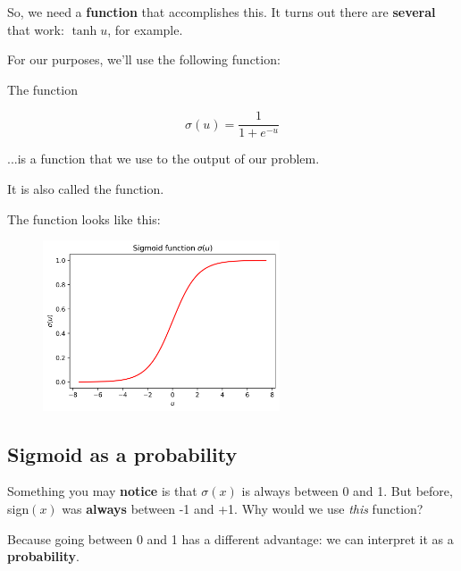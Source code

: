         So, we need a \textbf{function} that accomplishes this. It turns out there are \textbf{several} that work: $\tanh{u}$, for example.
        
        For our purposes, we'll use the following function:\\
        
        \begin{definition}
            The  function
            
            \begin{equation}
                \sigma(u) = \frac{1}{1+e^{-u}}
            \end{equation}
            
            ...is a  function that we use to  the output of our  problem.
            
            It is also called the  function.
        \end{definition}
        
        The function looks like this:
        
        \begin{figure}[H]
            \centering
            
            \includegraphics[width=70mm,scale=0.5]{images/classification_images/sigmoid_u.png}
        \end{figure}
        
    \subsection*{Sigmoid as a probability}
        
        Something you may \textbf{notice} is that $\sigma(x)$ is always between 0 and 1. But before, sign$(x)$ was \textbf{always} between -1 and +1. Why would we use \textit{this} function?
        
        Because going between 0 and 1 has a different advantage: we can interpret it as a \textbf{probability}.
        
